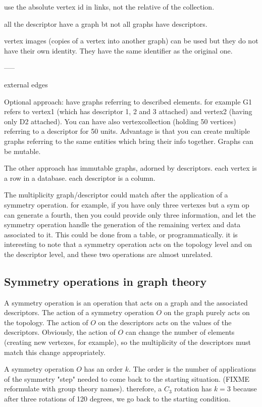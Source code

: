 \documentclass[a4paper,12pt,oneside]{book}
\begin{document}
use the absolute vertex id in links, not the relative of the collection.

all the descriptor have a graph bt not all graphs have descriptors.

vertex images (copies of a vertex into another graph) can be used but they
do not have their own identity. They have the same identifier as the
original one.

-----

external edges 



Optional approach:
have graphs referring to described elements. for example G1 refers to
vertex1 (which has descriptor 1, 2 and 3 attached) and vertex2 (having only
D2 attached). You can have also vertexcollection (holding 50 vertices)
referring to a descriptor for 50 units. Advantage is that you can create
multiple graphs referring to the same entities which bring their info
together. Graphs can be mutable.

The other approach has immutable graphs, adorned by descriptors.
each vertex is a row in a database. each descriptor is a column.

The multiplicity graph/descriptor could match after the application of a symmetry operation.
for example, if you have only three vertexes but a sym op can generate a
fourth, then you could provide only three information, and let the symmetry
operation handle the generation of the remaining vertex and data associated
to it. This could be done from a table, or programmatically. it is
interesting to note that a symmetry operation acts on the topology level and
on the descriptor level, and these two operations are almost unrelated.

\subsection{Symmetry operations in graph theory}

A symmetry operation is an operation that acts on a graph and the associated
descriptors. The action of a symmetry operation $O$ on the graph purely acts on
the topology. The action of $O$ on the descriptors acts on the values of the
descriptors. Obviously, the action of $O$ can change the number of elements
(creating new vertexes, for example), so the multiplicity of the descriptors
must match this change appropriately.

A symmetry operation $O$ has an order $k$. The order is the number of
applications of the symmetry "step" needed to come back to the starting
situation. (FIXME reformulate with group theory names). therefore, a $C_3$
rotation has $k=3$ because after three rotations of 120 degrees, we go back
to the starting condition.
\end{document}
